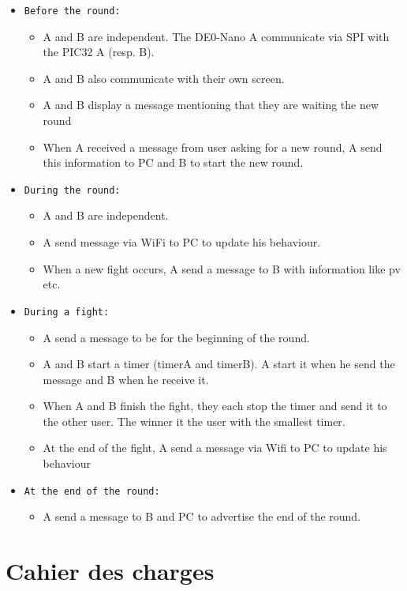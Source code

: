 \documentclass[10pt,a4paper]{article}
\begin{document}
    \begin{itemize}
        \item \texttt{Before the round:}
		\begin{itemize}
			\item A and B are independent. The DE0-Nano A communicate via SPI with the PIC32 A (resp. B).
			\item A and B also communicate with their own screen. 
			\item A and B display a message mentioning that they are waiting the new round
			\item When A received a message from user asking for a new round, A send this information to PC and B to start the new round.
		\end{itemize}
        \item \texttt{During the round:}
		\begin{itemize}
			\item A and B are independent.
			\item A send message via WiFi to PC to update his behaviour.
			\item When a new fight occurs, A send a message to B with information like pv etc.   
		\end{itemize}
        \item \texttt{During a fight:}
		\begin{itemize}
			\item A send a message to be for the beginning of the round.
			\item A and B start a timer (timerA and timerB). A start it when he send the message  and B when he receive it. 
			\item When A and B finish the fight,  they each stop the timer and send it to the other user. The winner it the user with the smallest timer. 
			\item At the end of the fight, A send a message via Wifi to PC to update his behaviour
        	\end{itemize}
	\item \texttt{At the end of the round:}
			\begin{itemize}
			\item A send a message to B and PC to advertise the end of the round. 
			\end{itemize}
    \end{itemize}
   
\newpage
\section{Cahier des charges}
 
\end{document}

